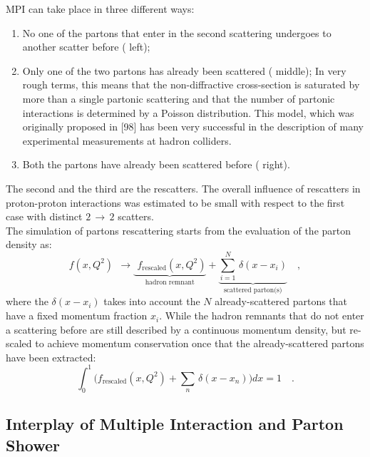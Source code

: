 \noindent MPI can take place in three different ways:
\begin{enumerate}
	\item No one of the partons that enter in the second scattering undergoes to another scatter before ( left);
	\item Only one of the two partons has already been scattered ( middle); In very rough terms, this means that the non-diffractive
cross-section is saturated by more than a single partonic scattering and that the number of partonic
interactions is determined by a Poisson distribution. This model, which was originally proposed in [98]
has been very successful in the description of many experimental measurements at hadron colliders.
	\item Both the partons have already been scattered before ( right). 
\end{enumerate}
The second and the third are the rescatters. The overall influence of rescatters in proton-proton interactions was estimated to be small with respect to the first case with distinct $2\,\rightarrow\,2$  scatters. 
\\
The simulation of partons rescattering starts from the evaluation of the parton density as:
\begin{equation}
	f(x,Q^2)\ \  \longrightarrow\! \underbrace{\phantom{\Bigg(} f_{\text{rescaled}}(x,Q^2)}_{\text{hadron remnant}}+\underbrace{\displaystyle\sum_{i=1}^N \,\delta(x-x_i)}_{\text{scattered parton(s)}}\quad,
\end{equation} 
where the $\delta(x-x_i)$ takes into account the $N$  already-scattered partons that have a fixed momentum fraction $x_i$. While the hadron remnants that do not enter a scattering before are still described by a continuous momentum density, but re-scaled to achieve momentum conservation once that the already-scattered partons have been extracted:
\begin{equation}	\displaystyle\int_0^1 \bigg( f_{\text{rescaled}}(x,Q^2) +\displaystyle\sum_n \,\delta(x-x_n) \bigg)dx=1\quad.
\end{equation}


\subsection{Interplay of Multiple Interaction and Parton Shower}

